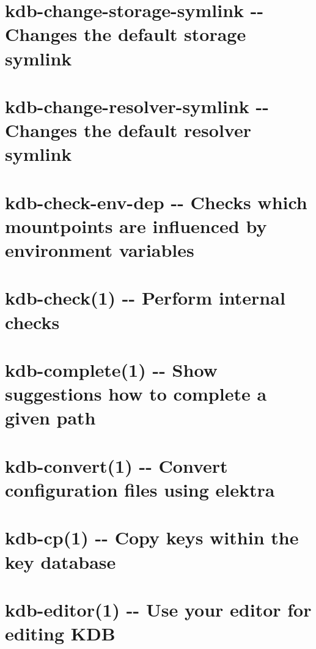 \documentclass[twoside]{book}
\newcommand{\+}{\discretionary{\mbox{\scriptsize$\hookleftarrow$}}{}{}}
\begin{document}
\chapter{kdb-\/change-\/storage-\/symlink -\/-\/ Changes the default storage symlink}
\label{md_doc_help_kdb-change-resolver-symlink}

\chapter{kdb-\/change-\/resolver-\/symlink -\/-\/ Changes the default resolver symlink}
\label{md_doc_help_kdb-change-storage-symlink}

\chapter{kdb-\/check-\/env-\/dep -\/-\/ Checks which mountpoints are influenced by environment variables}
\label{md_doc_help_kdb-check-env-dep}

\chapter{kdb-\/check(1) -\/-\/ Perform internal checks}
\label{md_doc_help_kdb-check}

\chapter{kdb-\/complete(1) -\/-\/ Show suggestions how to complete a given path}
\label{md_doc_help_kdb-complete}

\chapter{kdb-\/convert(1) -\/-\/ Convert configuration files using elektra}
\label{md_doc_help_kdb-convert}

\chapter{kdb-\/cp(1) -\/-\/ Copy keys within the key database}
\label{md_doc_help_kdb-cp}

\chapter{kdb-\/editor(1) -\/-\/ Use your editor for editing K\+DB}
\label{md_doc_help_kdb-editor}

\end{document}
